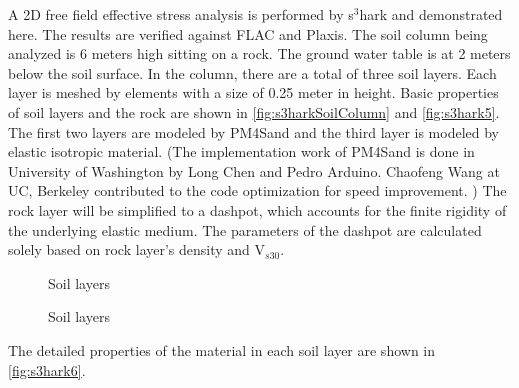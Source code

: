 A 2D free field effective stress analysis is performed by s$^3$hark
and demonstrated here.  The results are verified against FLAC and
Plaxis.  The soil column being analyzed is 6 meters high sitting on a
rock.  The ground water table is at 2 meters below the soil surface.
In the column, there are a total of three soil layers. Each layer is
meshed by elements with a size of 0.25 meter in height.  Basic
properties of soil layers and the rock are shown
in \autoref{fig:s3harkSoilColumn} and \autoref{fig:s3hark5}.  The
first two layers are modeled by PM4Sand and the third layer is modeled
by elastic isotropic material.  (The implementation work of
PM4Sand \cite{boulanger2015pm4sand} is done in University of
Washington by Long Chen and Pedro Arduino.  Chaofeng Wang at UC,
Berkeley contributed to the code optimization for speed improvement. )
The rock layer will be simplified to a \cite{Lysmer:1969} dashpot,
which accounts for the finite rigidity of the underlying elastic
medium.  The parameters of the dashpot are calculated solely based on
rock layer's density and V$_{s30}$.


\begin{figure}[!htbp]
  \caption{Soil layers }
  \label{fig:s3harkSoilColumn}
\end{figure}


\begin{figure}[!htbp]
  \caption{Soil layers }
  \label{fig:s3hark5}
\end{figure}


The detailed properties of the material in each soil layer are shown in \autoref{fig:s3hark6}.

